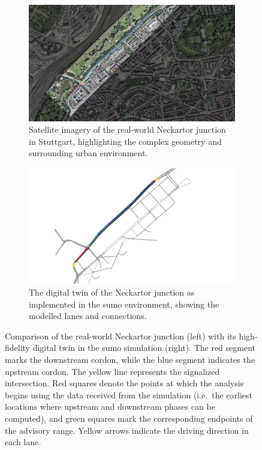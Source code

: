 \begin{figure}[htb]
  \centering
  \begin{subfigure}[b]{0.49\textwidth}
    \includegraphics[width=\linewidth, page=1]{data/img/Neckartor/StuttgartNeckartorReal.pdf}
    \caption[Neckartor junction satellite image]{Satellite imagery of the real-world Neckartor junction in Stuttgart, highlighting the complex geometry and surrounding urban environment.}
    \label{fig:NeckartorMapReal}
  \end{subfigure}
  \hfill
  \begin{subfigure}[b]{0.49\textwidth}
    \includegraphics[width=\linewidth, page=1]{data/img/Neckartor/StuttgartNeckartorSumo.pdf}
    \caption[Digital twin of Neckartor in \ac{sumo}]{The digital twin of the Neckartor junction as implemented in the \ac{sumo} environment, showing the modelled lanes and connections.}
    \label{fig:NeckartorMapSUMO}
  \end{subfigure}
  \caption[Real-World vs. Simulated Neckartor Junction]{Comparison of the real-world Neckartor junction (left) with its high-fidelity digital twin in the \ac{sumo} simulation (right). The red segment marks the downstream cordon, while the blue segment indicates the upstream cordon. The yellow line represents the signalized intersection. Red squares denote the points at which the analysis begins using the data received from the simulation (i.e.\ the earliest locations where upstream and downstream phases can be computed), and green squares mark the corresponding endpoints of the advisory range. Yellow arrows indicate the driving direction in each lane.}
  \label{fig:NeckartorMapComparison}
\end{figure}

